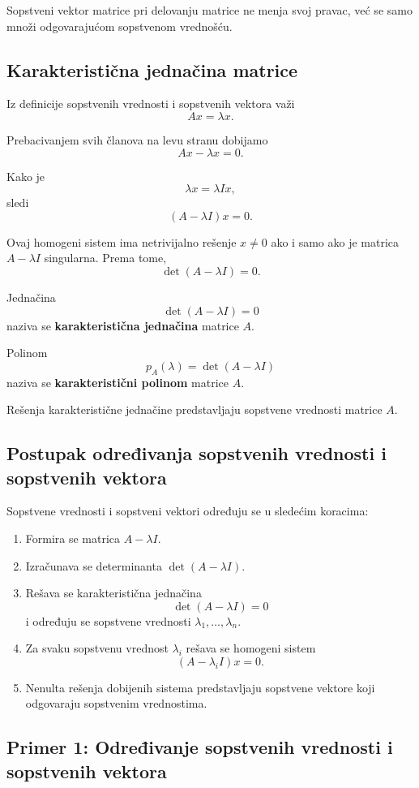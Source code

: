 \documentclass[12pt,a4paper]{report}
\begin{document}
Sopstveni vektor matrice pri delovanju matrice ne menja
svoj pravac, već se samo množi odgovarajućom sopstvenom
vrednošću.

\subsection{Karakteristična jednačina matrice}

Iz definicije sopstvenih vrednosti i sopstvenih vektora
važi
\[
Ax=\lambda x.
\]

Prebacivanjem svih članova na levu stranu dobijamo
\[
Ax-\lambda x=0.
\]

Kako je
\[
\lambda x=\lambda Ix,
\]
sledi
\[
(A-\lambda I)x=0.
\]

Ovaj homogeni sistem ima netrivijalno rešenje $x\neq 0$
ako i samo ako je matrica $A-\lambda I$ singularna.
Prema tome,
\[
\det(A-\lambda I)=0.
\]


Jednačina
\[
\boxed{\det(A-\lambda I)=0}
\]
naziva se \textbf{karakteristična jednačina} matrice $A$.

Polinom
\[
p_A(\lambda)=\det(A-\lambda I)
\]
naziva se \textbf{karakteristični polinom} matrice $A$.


Rešenja karakteristične jednačine predstavljaju sopstvene
vrednosti matrice $A$.

\subsection{Postupak određivanja sopstvenih vrednosti i sopstvenih vektora}

Sopstvene vrednosti i sopstveni vektori određuju se
u sledećim koracima:

\begin{enumerate}
	\item Formira se matrica $A-\lambda I$.
	\item Izračunava se determinanta $\det(A-\lambda I)$.
	\item Rešava se karakteristična jednačina
	\[
	\det(A-\lambda I)=0
	\]
	i određuju se sopstvene vrednosti $\lambda_1,\ldots,\lambda_n$.
	\item Za svaku sopstvenu vrednost $\lambda_i$ rešava se
	homogeni sistem
	\[
	(A-\lambda_i I)x=0.
	\]
	\item Nenulta rešenja dobijenih sistema predstavljaju
	sopstvene vektore koji odgovaraju sopstvenim vrednostima.
\end{enumerate}

\subsection{Primer 1: Određivanje sopstvenih vrednosti
	i sopstvenih vektora}
\end{document}
